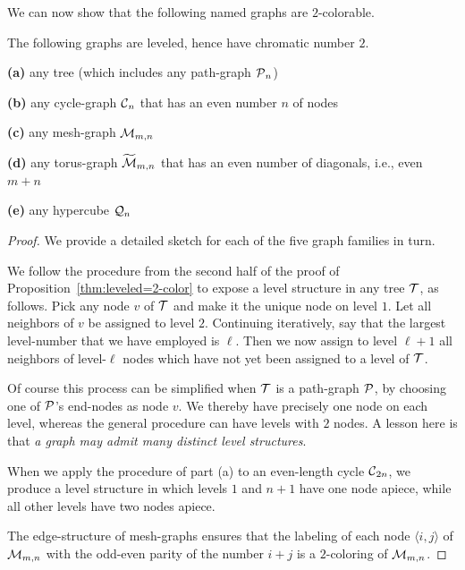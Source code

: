 We can now show that the following named graphs are $2$-colorable.

\begin{corol}
\label{thm:list-2-colorables}
The following graphs are leveled, hence have chromatic number $2$.

{\bf (a)}
any tree (which includes any path-graph $\mbox{$\cal P$}_n$)

{\bf (b)}
any cycle-graph $\mbox{$\cal C$}_n$ that has an even number $n$ of nodes

{\bf (c)}
any mesh-graph $\mbox{$\cal M$}_{m,n}$

{\bf (d)}
any torus-graph $\widetilde{\mbox{$\cal M$}}_{m,n}$ that has an even number of
diagonals, i.e., even $m+n$

{\bf (e)}
any hypercube $\mbox{$\cal Q$}_n$
\end{corol}

\begin{proof}
We provide a detailed sketch for each of the five graph families in
turn.

We follow the procedure from the second half of the proof of
Proposition~\ref{thm:leveled=2-color} to expose a level structure in
any tree $\mbox{$\cal T$}$, as follows.  Pick any node $v$ of $\mbox{$\cal T$}$ and make it the
unique node on level $1$.  Let all neighbors of $v$ be assigned to
level $2$.  Continuing iteratively, say that the largest level-number
that we have employed is $\ell$.  Then we now assign to level $\ell
+1$ all neighbors of level-$\ell$ nodes which have not yet been
assigned to a level of $\mbox{$\cal T$}$.

Of course this process can be simplified when $\mbox{$\cal T$}$ is a path-graph
$\mbox{$\cal P$}$, by choosing one of $\mbox{$\cal P$}$'s end-nodes as node $v$.  We thereby
have precisely one node on each level, whereas the general procedure
can have levels with $2$ nodes.  A lesson here is that {\em a graph
  may admit many distinct level structures}.

\medskip

When we apply the procedure of part (a) to an even-length cycle
$\mbox{$\cal C$}_{2n}$, we produce a level structure in which levels $1$ and $n+1$
have one node apiece, while all other levels have two nodes apiece.

\medskip

The edge-structure of mesh-graphs ensures that the labeling of each
node $\langle i,j \rangle$ of $\mbox{$\cal M$}_{m,n}$ with the odd-even parity of
the number $i+j$ is a $2$-coloring of $\mbox{$\cal M$}_{m,n}$.

\medskip


\end{proof}
